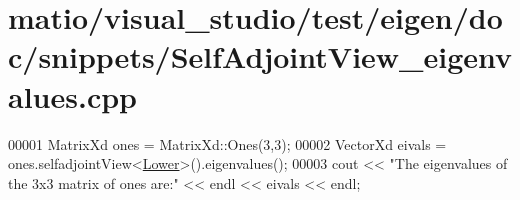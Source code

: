 \hypertarget{matio_2visual__studio_2test_2eigen_2doc_2snippets_2_self_adjoint_view__eigenvalues_8cpp_source}{}\section{matio/visual\+\_\+studio/test/eigen/doc/snippets/\+Self\+Adjoint\+View\+\_\+eigenvalues.cpp}
\label{matio_2visual__studio_2test_2eigen_2doc_2snippets_2_self_adjoint_view__eigenvalues_8cpp_source}

\begin{DoxyCode}
00001 MatrixXd ones = MatrixXd::Ones(3,3);
00002 VectorXd eivals = ones.selfadjointView<\hyperlink{group__enums_gga39e3366ff5554d731e7dc8bb642f83cda891792b8ed394f7607ab16dd716f60e6}{Lower}>().eigenvalues();
00003 cout << \textcolor{stringliteral}{"The eigenvalues of the 3x3 matrix of ones are:"} << endl << eivals << endl;
\end{DoxyCode}

